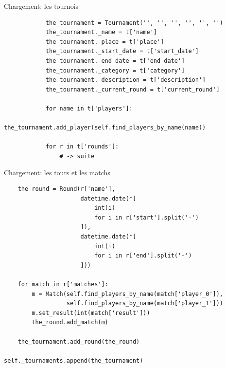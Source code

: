\begin{frame}[fragile]{Chargement: les tournois}
  \tiny
  \begin{verbatim}
            the_tournament = Tournament('', '', '', '', '', '')
            the_tournament._name = t['name']
            the_tournament._place = t['place']
            the_tournament._start_date = t['start_date']
            the_tournament._end_date = t['end_date']
            the_tournament._category = t['category']
            the_tournament._description = t['description']
            the_tournament._current_round = t['current_round']

            for name in t['players']:
                the_tournament.add_player(self.find_players_by_name(name))

            for r in t['rounds']:
                # -> suite
  \end{verbatim}
\end{frame}

\begin{frame}[fragile]{Chargement: les tours et les matchs}
  \footnotesize
  \begin{verbatim}
    the_round = Round(r['name'],
                      datetime.date(*[
                          int(i)
                          for i in r['start'].split('-')
                      ]),
                      datetime.date(*[
                          int(i)
                          for i in r['end'].split('-')
                      ]))

    for match in r['matches']:
        m = Match(self.find_players_by_name(match['player_0']),
                  self.find_players_by_name(match['player_1']))
        m.set_result(int(match['result']))
        the_round.add_match(m)

    the_tournament.add_round(the_round)

self._tournaments.append(the_tournament)
  \end{verbatim}
\end{frame}


